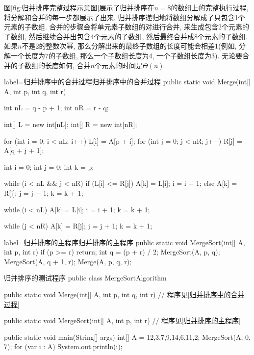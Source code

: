 \documentclass[oneside,10pt,fontset=none]{ctexbook}
\numberwithin{definition}{chapter}
\numberwithin{theorem}{chapter}
\numberwithin{lemma}{chapter}
\begin{document}
图\ref{fig:归并排序完整过程示意图}展示了归并排序在$n=8$的数组上的完整执行过程, 将分解和合并的每一步都展示了出来. 归并排序递归地将数组分解成了只包含1个元素的子数组. 合并的步骤会将单元素子数组的对进行合并, 来生成包含2个元素的子数组, 然后继续合并出包含4个元素的子数组, 然后最终合并成8个元素的子数组. 如果$n$不是2的整数次幂, 那么分解出来的最终子数组的长度可能会相差1(例如, 分解一个长度为7的子数组, 那么一个子数组长度为4, 一个子数组长度为3). 无论要合并的子数组的长度如何, 合并$n$个元素的时间是$\Theta(n)$.

\begin{myjava}{label={归并排序中的合并过程}}{归并排序中的合并过程}{}
    public static void Merge(int[] A, int p, int q, int r) {
        int nL = q - p + 1;
        int nR = r - q;

        int[] L = new int[nL];
        int[] R = new int[nR];

        for (int i = 0; i < nL; i++) {
            L[i] = A[p + i];
        }
        for (int j = 0; j < nR; j++) {
            R[j] = A[q + j + 1];
        }

        int i = 0;
        int j = 0;
        int k = p;

        while (i < nL && j < nR) {
            if (L[i] <= R[j]) {
                A[k] = L[i];
                i = i + 1;
            } else {
                A[k] = R[j];
                j = j + 1;
            }
            k = k + 1;
        }

        while (i < nL) {
            A[k] = L[i];
            i = i + 1;
            k = k + 1;
        }

        while (j < nR) {
            A[k] = R[j];
            j = j + 1;
            k = k + 1;
        }
    }
\end{myjava}

\begin{myjava}{label={归并排序的主程序}}{归并排序的主程序}{}
    public static void MergeSort(int[] A, int p, int r) {
        if (p >= r) return;
        int q = (p + r) / 2;
        MergeSort(A, p, q);
        MergeSort(A, q + 1, r);
        Merge(A, p, q, r);
    }
\end{myjava}

\begin{myjava}{}{归并排序的测试程序}{}
public class MergeSortAlgorithm {
    public static void Merge(int[] A, int p, int q, int r) {
        // 程序见\ref{归并排序中的合并过程}
    }

    public static void MergeSort(int[] A, int p, int r) {
        // 程序见\ref{归并排序的主程序}
    }

    public static void main(String[] args) {
        int[] A = {12,3,7,9,14,6,11,2};
        MergeSort(A, 0, 7);
        for (var i : A)
            System.out.println(i);
    }
}
\end{myjava}
\end{document}

